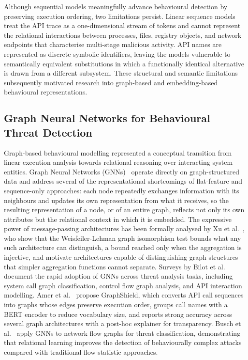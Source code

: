 \documentclass[%
    BCOR=10mm,
    DIV=13,
    toc=bibliography,
    toc=listof,
    oneside,
    12pt,
]{scrbook}
\begin{document}
Although sequential models meaningfully advance behavioural detection by
preserving execution ordering, two limitations persist. Linear sequence models
treat the API trace as a one-dimensional stream of tokens and cannot represent
the relational interactions between processes, files, registry objects, and
network endpoints that characterise multi-stage malicious activity. API names
are represented as discrete symbolic identifiers, leaving the models vulnerable
to semantically equivalent substitutions in which a functionally identical
alternative is drawn from a different subsystem. These structural and semantic
limitations subsequently motivated research into graph-based and
embedding-based behavioural representations.

\subsection{Graph Neural Networks for Behavioural Threat Detection}
\label{subsec:gnn}

Graph-based behavioural modelling represented a conceptual transition from
linear execution analysis towards relational reasoning over interacting system
entities. Graph Neural Networks (GNNs)~\cite{scarselli2009, gilmer2017mpnn,
kipf2017gcn} operate directly on graph-structured data and address several of
the representational shortcomings of flat-feature and sequence-only
approaches: each node repeatedly exchanges information with its neighbours
and updates its own representation from what it receives, so the resulting
representation of a node, or of an entire graph, reflects not only its own
attributes but the relational context in which it is embedded. The expressive
power of message-passing architectures has been formally analysed by Xu et
al.~\cite{xu2018powerful}, who show that the Weisfeiler-Lehman graph
isomorphism test bounds what any such architecture can distinguish, a bound
reached only when the aggregation is injective, and motivate architectures
capable of distinguishing graph structures that simpler aggregation functions
cannot separate. Surveys by Bilot et al.~\cite{bilot2024survey,
bilot2023intrusion} document the rapid adoption of GNNs across threat analysis
tasks, including system call graph
classification, control flow graph analysis, and API interaction modelling.
Amer et al.~\cite{amer2025graphshield} propose GraphShield, which converts API
call sequences into graphs whose edges preserve execution order, groups call
names with a BERT encoder to reduce vocabulary size, and reports strong accuracy
across several graph architectures with a post-hoc explainer for transparency.
Busch et al.~\cite{busch2022} apply GNNs to network flow graphs for threat
classification, demonstrating that relational learning improves the detection
of behaviourally complex attacks compared with traditional flow-statistic
approaches.
\end{document}
